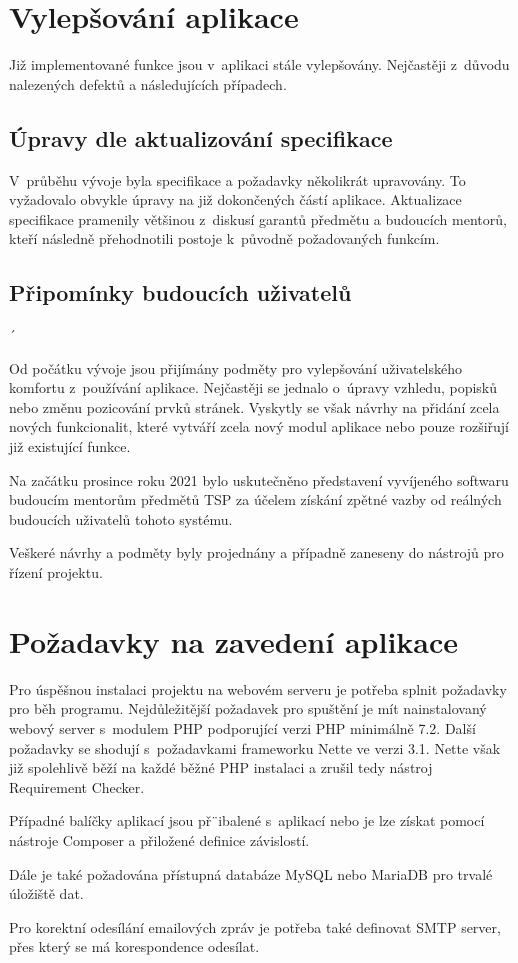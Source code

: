 \documentclass[czech,BP]{thesiskiv}
\begin{document}
	\section{Vylepšování aplikace}
	\par Již implementované funkce jsou v~aplikaci stále vylepšovány. Nejčastěji z~důvodu nalezených defektů a následujících případech.
	\subsection{Úpravy dle aktualizování specifikace}
	\par V~průběhu vývoje byla specifikace a požadavky několikrát upravovány. To vyžadovalo obvykle úpravy na již dokončených částí aplikace. Aktualizace specifikace pramenily většinou z~diskusí garantů předmětu a budoucích mentorů, kteří následně přehodnotili postoje k~původně požadovaných funkcím. 
	\subsection{Připomínky budoucích uživatelů}´
	\par Od počátku vývoje jsou přijímány podměty pro vylepšování uživatelského komfortu z~používání aplikace. Nejčastěji se jednalo o~úpravy vzhledu, popisků nebo změnu pozicování prvků stránek. Vyskytly se však návrhy na přidání zcela nových funkcionalit, které vytváří zcela nový modul aplikace nebo pouze rozšiřují již existující funkce.
	\par Na začátku prosince roku 2021 bylo uskutečněno představení vyvíjeného softwaru budoucím mentorům předmětů TSP za účelem získání zpětné vazby od reálných budoucích uživatelů tohoto systému.
	\par Veškeré návrhy a podměty byly projednány a případně zaneseny do nástrojů pro řízení projektu.
	\section{Požadavky na zavedení aplikace}
	\par Pro úspěšnou instalaci projektu na webovém serveru je potřeba splnit požadavky pro běh programu. Nejdůležitější požadavek pro spuštění je mít nainstalovaný webový server s~modulem PHP podporující verzi PHP minimálně 7.2. Další požadavky se shodují s~požadavkami frameworku Nette ve verzi 3.1. Nette však již spolehlivě běží na každé běžné PHP instalaci a zrušil tedy nástroj Requirement Checker.
	\par Případné balíčky aplikací jsou př¨ibalené s~aplikací nebo je lze získat pomocí nástroje Composer a přiložené definice závislostí.
	\par Dále je také požadována přístupná databáze MySQL nebo MariaDB pro trvalé úložiště dat.
	\par Pro korektní odesílání emailových zpráv je potřeba také definovat SMTP server, přes který se má korespondence odesílat.
	\pagebreak
\end{document}
